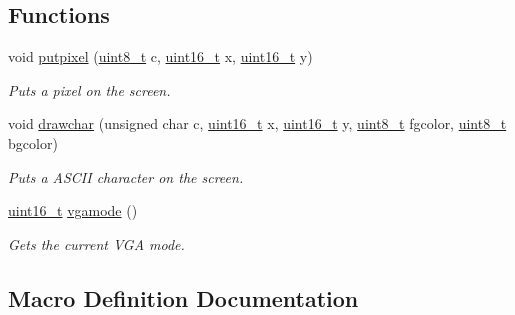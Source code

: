 \subsection*{Functions}
\begin{DoxyCompactItemize}
\item 
void \hyperlink{a00011_ab17a69b465efb1ebe54a6a2e5d7b7ce8_ab17a69b465efb1ebe54a6a2e5d7b7ce8}{putpixel} (\hyperlink{a00047_aba7bc1797add20fe3efdf37ced1182c5_aba7bc1797add20fe3efdf37ced1182c5}{uint8\+\_\+t} c, \hyperlink{a00047_a273cf69d639a59973b6019625df33e30_a273cf69d639a59973b6019625df33e30}{uint16\+\_\+t} x, \hyperlink{a00047_a273cf69d639a59973b6019625df33e30_a273cf69d639a59973b6019625df33e30}{uint16\+\_\+t} y)
\begin{DoxyCompactList}\small\item\em Puts a pixel on the screen. \end{DoxyCompactList}\item 
void \hyperlink{a00011_a2c8df7a20b47341b70d97a7ff21d86ea_a2c8df7a20b47341b70d97a7ff21d86ea}{drawchar} (unsigned char c, \hyperlink{a00047_a273cf69d639a59973b6019625df33e30_a273cf69d639a59973b6019625df33e30}{uint16\+\_\+t} x, \hyperlink{a00047_a273cf69d639a59973b6019625df33e30_a273cf69d639a59973b6019625df33e30}{uint16\+\_\+t} y, \hyperlink{a00047_aba7bc1797add20fe3efdf37ced1182c5_aba7bc1797add20fe3efdf37ced1182c5}{uint8\+\_\+t} fgcolor, \hyperlink{a00047_aba7bc1797add20fe3efdf37ced1182c5_aba7bc1797add20fe3efdf37ced1182c5}{uint8\+\_\+t} bgcolor)
\begin{DoxyCompactList}\small\item\em Puts a A\+S\+C\+II character on the screen. \end{DoxyCompactList}\item 
\hyperlink{a00047_a273cf69d639a59973b6019625df33e30_a273cf69d639a59973b6019625df33e30}{uint16\+\_\+t} \hyperlink{a00011_af6d170c9401ea8f94d4c5cf09347cca7_af6d170c9401ea8f94d4c5cf09347cca7}{vgamode} ()
\begin{DoxyCompactList}\small\item\em Gets the current V\+GA mode. \end{DoxyCompactList}\end{DoxyCompactItemize}


\subsection{Macro Definition Documentation}
\mbox{\label{a00011_a2cd109632a6dcccaa80b43561b1ab700_a2cd109632a6dcccaa80b43561b1ab700}} 
